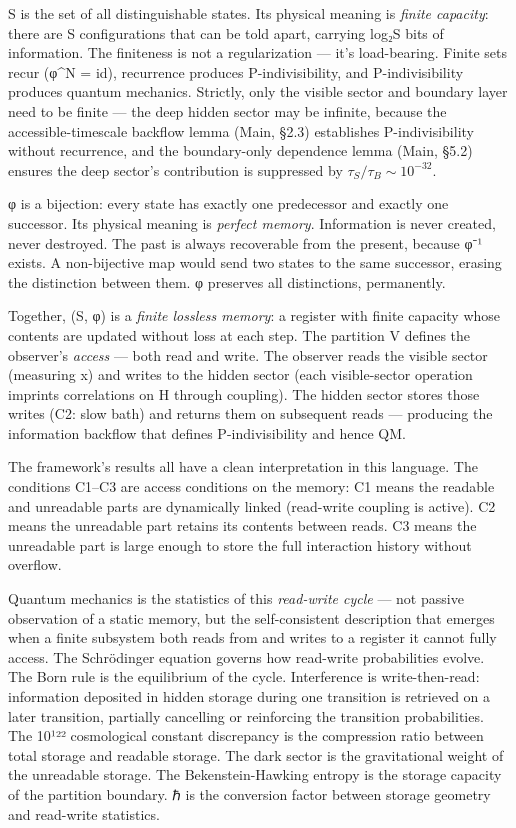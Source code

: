 \documentclass[
]{article}
\begin{document}
S is the set of all distinguishable states. Its physical meaning is
\emph{finite capacity}: there are \textbar S\textbar{} configurations
that can be told apart, carrying log₂\textbar S\textbar{} bits of
information. The finiteness is not a regularization --- it's
load-bearing. Finite sets recur (φ\^{}N = id), recurrence produces
P-indivisibility, and P-indivisibility produces quantum mechanics.
Strictly, only the visible sector and boundary layer need to be finite
--- the deep hidden sector may be infinite, because the
accessible-timescale backflow lemma (Main, §2.3) establishes
P-indivisibility without recurrence, and the boundary-only dependence
lemma (Main, §5.2) ensures the deep sector's contribution is suppressed
by \(\tau_S/\tau_B \sim 10^{-32}\).

φ is a bijection: every state has exactly one predecessor and exactly
one successor. Its physical meaning is \emph{perfect memory}.
Information is never created, never destroyed. The past is always
recoverable from the present, because φ⁻¹ exists. A non-bijective map
would send two states to the same successor, erasing the distinction
between them. φ preserves all distinctions, permanently.

Together, (S, φ) is a \emph{finite lossless memory}: a register with
finite capacity whose contents are updated without loss at each step.
The partition V defines the observer's \emph{access} --- both read and
write. The observer reads the visible sector (measuring x) and writes to
the hidden sector (each visible-sector operation imprints correlations
on H through coupling). The hidden sector stores those writes (C2: slow
bath) and returns them on subsequent reads --- producing the information
backflow that defines P-indivisibility and hence QM.

The framework's results all have a clean interpretation in this
language. The conditions C1--C3 are access conditions on the memory: C1
means the readable and unreadable parts are dynamically linked
(read-write coupling is active). C2 means the unreadable part retains
its contents between reads. C3 means the unreadable part is large enough
to store the full interaction history without overflow.

Quantum mechanics is the statistics of this \emph{read-write cycle} ---
not passive observation of a static memory, but the self-consistent
description that emerges when a finite subsystem both reads from and
writes to a register it cannot fully access. The Schrödinger equation
governs how read-write probabilities evolve. The Born rule is the
equilibrium of the cycle. Interference is write-then-read: information
deposited in hidden storage during one transition is retrieved on a
later transition, partially cancelling or reinforcing the transition
probabilities. The 10¹²² cosmological constant discrepancy is the
compression ratio between total storage and readable storage. The dark
sector is the gravitational weight of the unreadable storage. The
Bekenstein-Hawking entropy is the storage capacity of the partition
boundary. ℏ is the conversion factor between storage geometry and
read-write statistics.
\end{document}
